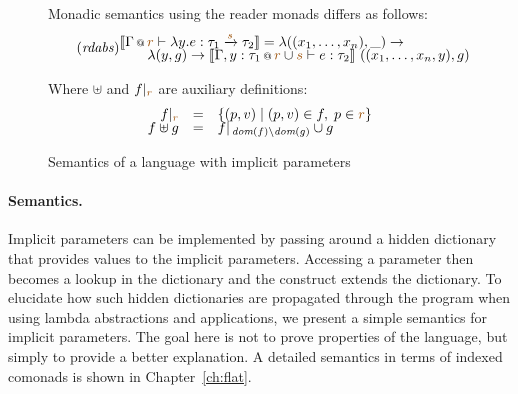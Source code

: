 \begin{figure}
\vspace{1em}
{\small Monadic semantics using the reader monads differs as follows:}
\begin{equation}
\tag{\emph{rdabs}}
\hspace{-0.5em}
\begin{array}{l}
  \sem{\coctx{\Gamma}{\aclrd{r}} \vdash \lambda y. e : \tau_1 \xrightarrow{\aclrd{s}} \tau_2 } = \lambda ((x_1, \ldots, x_n), \_) \rightarrow\\[-0.25em]
  \qquad\lambda (y, g) \rightarrow \sem{ \coctx{\Gamma,y:\tau_1}{\aclrd{r}\cup\aclrd{s}} \vdash e : \tau_2 }~((x_1, \ldots, x_n, y), g)   	 
\end{array}
\end{equation}

\vspace{1em}
{\small Where $\uplus$ and $\restr{f}{\aclrd{r}}$ are auxiliary definitions:}
\begin{equation*}
\begin{array}{rcl}
\restr{f}{\aclrd{r}} &=& \{ (p,v) \;|\; (p,v) \in f, \;p \in \aclrd{r} \}\\[-0.25em]
f \uplus g &=& \restr{f}{\, \textit{dom}(f) \setminus \textit{dom}(g)} \cup g 
\end{array}
\end{equation*}


\caption{Semantics of a language with implicit parameters}
\label{fig:applications-flat-implsem}
\end{figure}


\paragraph{Semantics.}
Implicit parameters can be implemented by passing around a hidden dictionary that provides values
to the implicit parameters. Accessing a parameter then becomes a lookup in the dictionary and
the  construct extends the dictionary. To elucidate how such hidden dictionaries 
are propagated through the program when using lambda abstractions and applications, we present a 
simple semantics for implicit parameters. The goal here is not to prove properties of the language,
but simply to provide a better explanation. A detailed semantics in terms of indexed comonads is
shown in Chapter~\ref{ch:flat}.

